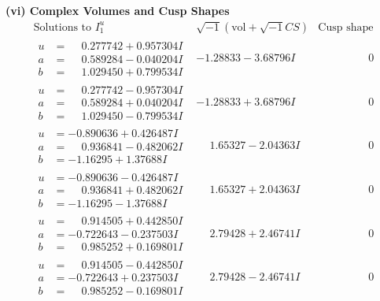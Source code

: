 \documentclass[1p]{elsarticle_modified}
\theoremstyle{definition}
\newcommand{\I}{\sqrt{-1}}
\begin{document}
\newpage\flushleft \textbf{(vi) Complex Volumes and Cusp Shapes}
$$\begin{array}{c|c|c}  
\text{Solutions to }I^u_{1}& \I (\text{vol} + \sqrt{-1}CS) & \text{Cusp shape}\\
 \hline 
\begin{aligned}
u &= \phantom{-}0.277742 + 0.957304 I \\
a &= \phantom{-}0.589284 - 0.040204 I \\
b &= \phantom{-}1.029450 + 0.799534 I\end{aligned}
 & -1.28833 - 3.68796 I & \phantom{-0.000000 } 0 \\ \hline\begin{aligned}
u &= \phantom{-}0.277742 - 0.957304 I \\
a &= \phantom{-}0.589284 + 0.040204 I \\
b &= \phantom{-}1.029450 - 0.799534 I\end{aligned}
 & -1.28833 + 3.68796 I & \phantom{-0.000000 } 0 \\ \hline\begin{aligned}
u &= -0.890636 + 0.426487 I \\
a &= \phantom{-}0.936841 - 0.482062 I \\
b &= -1.16295 + 1.37688 I\end{aligned}
 & \phantom{-}1.65327 - 2.04363 I & \phantom{-0.000000 } 0 \\ \hline\begin{aligned}
u &= -0.890636 - 0.426487 I \\
a &= \phantom{-}0.936841 + 0.482062 I \\
b &= -1.16295 - 1.37688 I\end{aligned}
 & \phantom{-}1.65327 + 2.04363 I & \phantom{-0.000000 } 0 \\ \hline\begin{aligned}
u &= \phantom{-}0.914505 + 0.442850 I \\
a &= -0.722643 - 0.237503 I \\
b &= \phantom{-}0.985252 + 0.169801 I\end{aligned}
 & \phantom{-}2.79428 + 2.46741 I & \phantom{-0.000000 } 0 \\ \hline\begin{aligned}
u &= \phantom{-}0.914505 - 0.442850 I \\
a &= -0.722643 + 0.237503 I \\
b &= \phantom{-}0.985252 - 0.169801 I\end{aligned}
 & \phantom{-}2.79428 - 2.46741 I & \phantom{-0.000000 } 0 \\ \hline\begin{aligned}

\end{aligned}
\end{array}$$
\end{document}
